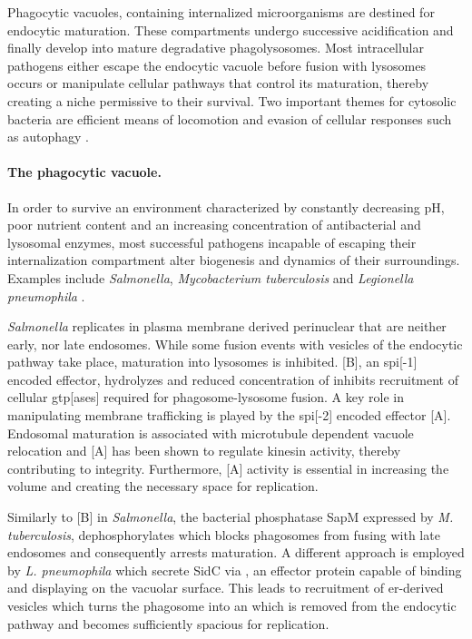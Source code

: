 Phagocytic vacuoles, containing internalized microorganisms are destined for endocytic maturation. These compartments undergo successive acidification and finally develop into mature degradative phagolysosomes. Most intracellular pathogens either escape the endocytic vacuole before fusion with lysosomes occurs or manipulate cellular pathways that control its maturation, thereby creating a niche permissive to their survival. Two important themes for cytosolic bacteria are efficient means of locomotion and evasion of cellular responses such as autophagy \citep{Alberts2008}.

\paragraph{The phagocytic vacuole.}
In order to survive an environment characterized by constantly decreasing pH, poor nutrient content and an increasing concentration of antibacterial and lysosomal enzymes, most successful pathogens incapable of escaping their internalization compartment alter biogenesis and dynamics of their surroundings. Examples include \textit{Salmonella}, \textit{Mycobacterium tuberculosis} and \textit{Legionella pneumophila} \citep{Ham2011,Ray2009}.

\textit{Salmonella} replicates in plasma membrane derived perinuclear  that are neither early, nor late endosomes. While some fusion events with vesicles of the endocytic pathway take place, maturation into lysosomes is inhibited. [B], an \acrshort{spi}[-1] encoded  effector, hydrolyzes  and reduced concentration of  inhibits recruitment of cellular  \acrshort{gtp}[ases] required for phagosome-lysosome fusion. A key role in manipulating membrane trafficking is played by the \acrshort{spi}[-2] encoded  effector [A]. Endosomal maturation is associated with microtubule dependent vacuole relocation and [A] has been shown to regulate kinesin activity, thereby contributing to  integrity. Furthermore, [A] activity is essential in increasing the  volume and creating the necessary space for replication.

Similarly to [B] in \textit{Salmonella}, the bacterial phosphatase SapM expressed by \textit{M. tuberculosis}, dephosphorylates  which blocks phagosomes from fusing with late endosomes and consequently arrests maturation. A different approach is employed by \textit{L. pneumophila} which secrete SidC via , an effector protein capable of binding and displaying  on the vacuolar surface. This leads to recruitment of \acrshort{er}-derived vesicles which turns the phagosome into an  which is removed from the endocytic pathway and becomes sufficiently spacious for replication.

